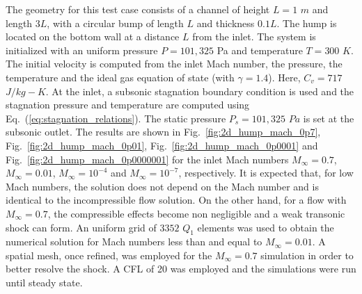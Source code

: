 \documentclass[review,10pt]{elsarticle}
\newcommand{\eqt}[1]{Eq.~(\ref{#1})}                     %
\newcommand{\fig}[1]{Fig.~\ref{#1}}                      %
\begin{document}
The geometry for this test case consists of a channel of height $L=1$ $m$ 
and length $3L$, with a circular bump of length $L$ and thickness $0.1L$. The hump is located on the bottom 
wall at a distance $L$ from the inlet. The system is initialized with an uniform pressure $P=101,325$ Pa
and temperature $T=300$ $K$. The initial velocity is computed from the inlet Mach number, the pressure, the 
temperature and the ideal gas equation of state (with  $\gamma=1.4$). Here,  $C_v = 717$ $J/kg-K$. At the inlet, a 
subsonic stagnation boundary condition is used and the stagnation pressure and temperature are computed 
using \eqt{eq:stagnation_relations}.
The static pressure $P_s = 101,325$ $Pa$ is set at the subsonic outlet. The results are shown in \fig{fig:2d_hump_mach_0p7}, 
\fig{fig:2d_hump_mach_0p01}, \fig{fig:2d_hump_mach_0p0001} and \fig{fig:2d_hump_mach_0p0000001} for the inlet 
Mach numbers $M_{\infty}=0.7$, $M_{\infty}=0.01$, $M_{\infty}=10^{-4}$ and $M_{\infty}=10^{-7}$, respectively. 
It is expected that, for low Mach numbers, the solution does not depend on the Mach number and is 
identical to the incompressible flow solution. On the other hand, for a flow with $M_{\infty}=0.7$, 
the compressible effects become non negligible and a weak transonic shock can form. An uniform grid of $3352$ $Q_1$ elements 
was used to obtain the numerical solution for Mach numbers less than and equal to $M_{\infty}=0.01$. A spatial mesh, once refined, was 
employed for the $M_{\infty}=0.7$ simulation in order to better resolve the shock. A CFL of 20 was employed 
and the simulations were run until steady state.
%
\end{document}
